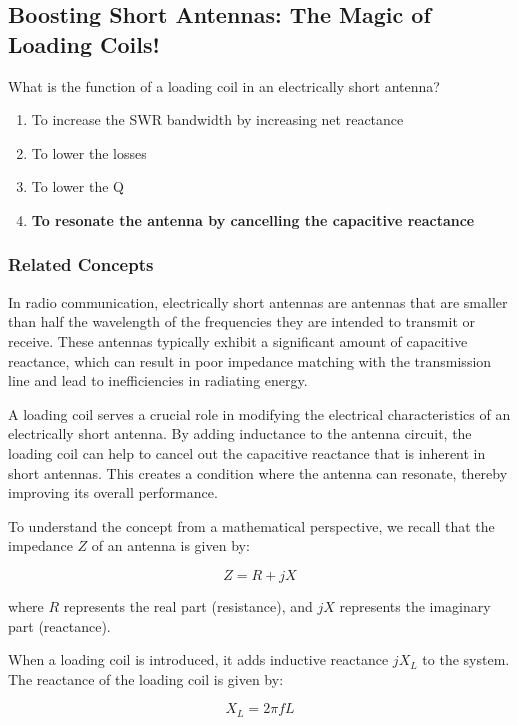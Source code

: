\subsection{Boosting Short Antennas: The Magic of Loading Coils!}
\begin{tcolorbox}[colback=gray!10, colframe=black, title=E9D09]
What is the function of a loading coil in an electrically short antenna?
\begin{enumerate}[label=\Alph*.]
    \item To increase the SWR bandwidth by increasing net reactance
    \item To lower the losses
    \item To lower the Q
    \item \textbf{To resonate the antenna by cancelling the capacitive reactance}
\end{enumerate} \end{tcolorbox}

\subsubsection{Related Concepts}
In radio communication, electrically short antennas are antennas that are smaller than half the wavelength of the frequencies they are intended to transmit or receive. These antennas typically exhibit a significant amount of capacitive reactance, which can result in poor impedance matching with the transmission line and lead to inefficiencies in radiating energy.

A loading coil serves a crucial role in modifying the electrical characteristics of an electrically short antenna. By adding inductance to the antenna circuit, the loading coil can help to cancel out the capacitive reactance that is inherent in short antennas. This creates a condition where the antenna can resonate, thereby improving its overall performance.

To understand the concept from a mathematical perspective, we recall that the impedance \( Z \) of an antenna is given by:

\[
Z = R + jX
\]

where \( R \) represents the real part (resistance), and \( jX \) represents the imaginary part (reactance).

When a loading coil is introduced, it adds inductive reactance \( jX_L \) to the system. The reactance of the loading coil is given by:

\[
X_L = 2 \pi f L
\]

